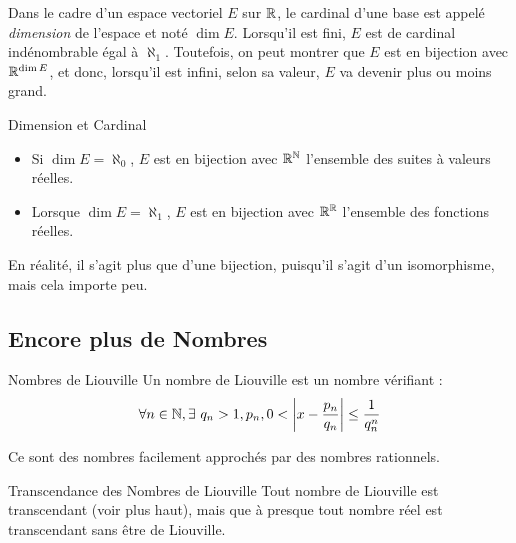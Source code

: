 \documentclass{cours}
\begin{document}
    Dans le cadre d'un espace vectoriel $E$ sur $\mathbb{R}$, le cardinal d'une base est appelé \emph{dimension} de l'espace et noté $\dim E$. Lorsqu'il est fini, $E$ est de cardinal indénombrable égal à $\aleph_{1}$. Toutefois, on peut montrer que $E$ est en bijection avec $\mathbb{R}^{\dim E}$, et donc, lorsqu'il est infini, selon sa valeur, $E$ va devenir plus ou moins grand.\\
    \begin{propositionfr}{Dimension et Cardinal}{}
        \begin{itemize}
            \item Si $\dim E = \aleph_{0}$, $E$ est en bijection avec $\mathbb{R}^{\mathbb{N}}$ l'ensemble des suites à valeurs réelles.
            \item Lorsque $\dim E = \aleph_{1}$, $E$ est en bijection avec $\mathbb{R}^{\mathbb{R}}$ l'ensemble des fonctions réelles.
        \end{itemize}
    \end{propositionfr}

    \begin{remarque}{}{}
        En réalité, il s'agit plus que d'une bijection, puisqu'il s'agit d'un isomorphisme, mais cela importe peu. 
    \end{remarque}

    \subsection{Encore plus de Nombres}
    \begin{définition}{Nombres de Liouville}{}
        Un nombre de Liouville est un nombre vérifiant : 
    \[
        \forall n \in \mathbb{N}, \exists\ q_{n} > 1, p_{n}, 0 < \left|x - \frac{p_{n}}{q_{n}}\right| \leq \frac{1}{q_{n}^{n}}
    \]
    \end{définition}

    \begin{remarque}{}{}
        Ce sont des nombres facilement approchés par des nombres rationnels.
    \end{remarque}

    \begin{théorème}{Transcendance des Nombres de Liouville}{}
        Tout nombre de Liouville est transcendant (voir plus haut), mais que à presque tout nombre réel est transcendant sans être de Liouville.
    \end{théorème}
    
\end{document}
